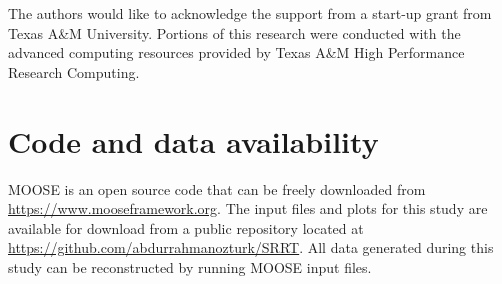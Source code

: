 \documentclass[utf8]{frontiersSCNS} %
\begin{document}
The authors would like to acknowledge the support from a start-up grant from Texas A\&M University. Portions of this research were conducted with the advanced computing resources provided by Texas A\&M High Performance Research Computing.         

\section*{Code and data availability}

MOOSE is an open source code that can be freely downloaded from \href{https://www.mooseframework.org}{https://www.mooseframework.org}. The input files and plots for this study are available for download from a public repository located at
\href{https://github.com/abdurrahmanozturk/SRRT}{https://github.com/abdurrahmanozturk/SRRT}. All data generated during this study can be reconstructed by running MOOSE input files.
\clearpage


\end{document}
